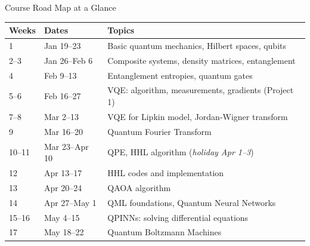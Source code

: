 \documentclass[aspectratio=169,12pt]{beamer}
\begin{document}
\begin{frame}{Course Road Map at a Glance}
  \begin{center}
  \small
  \renewcommand{\arraystretch}{1.25}
  \begin{tabular}{@{}llp{7.2cm}@{}}
    \toprule
    \textbf{Weeks} & \textbf{Dates} & \textbf{Topics} \\
    \midrule
    1   & Jan 19--23  & Basic quantum mechanics, Hilbert spaces, qubits \\
    2--3 & Jan 26--Feb 6 & Composite systems, density matrices, entanglement \\
    4   & Feb 9--13   & Entanglement entropies, quantum gates \\
    5--6 & Feb 16--27 & VQE: algorithm, measurements, gradients (Project 1) \\
    7--8 & Mar 2--13  & VQE for Lipkin model, Jordan-Wigner transform \\
    9   & Mar 16--20  & Quantum Fourier Transform \\
    10--11 & Mar 23--Apr 10 & QPE, HHL algorithm (\textit{holiday Apr 1--3}) \\
    12  & Apr 13--17  & HHL codes and implementation \\
    13  & Apr 20--24  & QAOA algorithm \\
    14  & Apr 27--May 1 & QML foundations, Quantum Neural Networks \\
    15--16 & May 4--15 & QPINNs: solving differential equations \\
    17  & May 18--22  & Quantum Boltzmann Machines \\
    \bottomrule
  \end{tabular}
  \end{center}
\end{frame}
\end{document}
